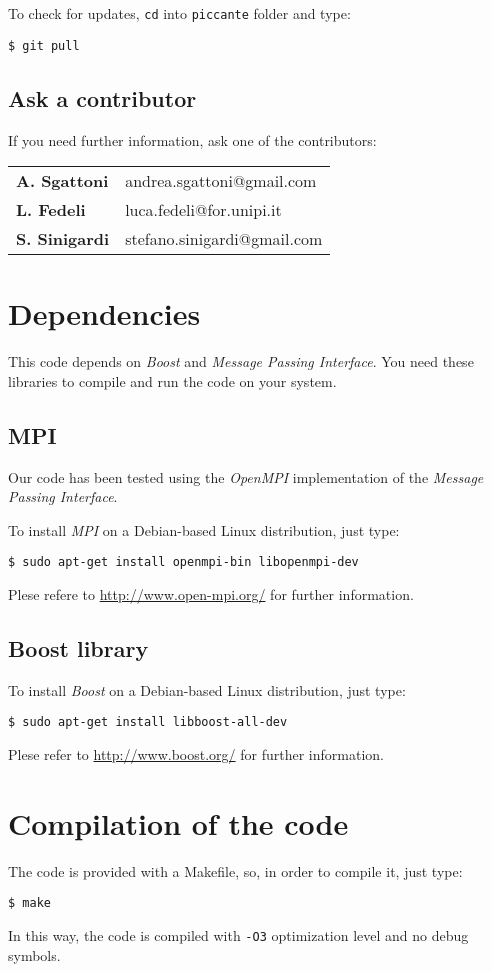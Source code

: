 \documentclass[11pt,a4paper]{report}
\begin{document}
To check for updates, \verb+cd+ into \verb+piccante+ folder and type:
\begin{verbatim}
$ git pull
\end{verbatim}

\subsection{Ask a contributor}
If you need further information, ask one of the contributors:
\begin{center}
    \begin{tabular}{ l | l }
    	\textbf{A. Sgattoni}  & andrea.sgattoni@gmail.com    \\
    	\textbf{L. Fedeli}    & luca.fedeli@for.unipi.it     \\
    	\textbf{S. Sinigardi} & stefano.sinigardi@gmail.com 
    \end{tabular}
\end{center}

\section{Dependencies}
This code depends on \emph{Boost} and \emph{Message Passing Interface}. You need these libraries to compile and run the code on your system. 

\subsection{MPI}
Our code has been tested using the \emph{OpenMPI} implementation of the \emph{Message Passing Interface}.

To install \emph{MPI} on a Debian-based Linux distribution, just type: 
\begin{verbatim}
$ sudo apt-get install openmpi-bin libopenmpi-dev
\end{verbatim}
Plese refere to \url{http://www.open-mpi.org/} for further information.

\subsection{Boost library}
To install \emph{Boost} on a Debian-based Linux distribution, just type: 
\begin{verbatim}
$ sudo apt-get install libboost-all-dev
\end{verbatim}
Plese refer to \url{http://www.boost.org/} for further information.


\section{Compilation of the code}
The code is provided with a Makefile, so, in order to compile it, just type:
\begin{verbatim}
$ make
\end{verbatim}
In this way, the code is compiled with \verb+-O3+ optimization level and no debug symbols.
\end{document}
